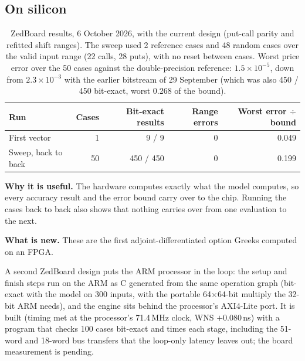 \documentclass[11pt,a4paper]{article}
\newcommand{\useful}[1]{\par\noindent\textbf{\textcolor{accent}{Why it is useful.}} #1\par}
\newcommand{\novel}[1]{\par\noindent\textbf{\textcolor{accent}{What is new.}} #1\par}
\newcommand{\hi}{\rowcolor{accentsoft}}
\begin{document}
\subsection{On silicon}
\begin{table}[H]
\centering
\small
\begin{tabular}{@{}lrrrr@{}}
\toprule
\textbf{Run} & \textbf{Cases} & \textbf{Bit-exact results} & \textbf{Range errors} & \textbf{Worst error $\div$ bound}\\
\midrule
First vector & 1 & 9 / 9 & 0 & 0.049\\
\hi Sweep, back to back & 50 & 450 / 450 & 0 & 0.199\\
\bottomrule
\end{tabular}
\caption{ZedBoard results, 6 October 2026, with the current design (put-call parity
and refitted shift ranges). The sweep used 2 reference cases and 48 random cases over
the valid input range (22 calls, 28 puts), with no reset between cases. Worst price
error over the 50 cases against the double-precision reference: $1.5\times10^{-5}$,
down from $2.3\times10^{-3}$ with the earlier bitstream of 29 September (which was also
450 / 450 bit-exact, worst 0.268 of the bound).}
\end{table}

\useful{The hardware computes exactly what the model computes, so every accuracy result
and the error bound carry over to the chip. Running the cases back to back also shows
that nothing carries over from one evaluation to the next.}
\novel{These are the first adjoint-differentiated option Greeks computed on an FPGA.}

A second ZedBoard design puts the ARM processor in the loop: the setup and finish steps
run on the ARM as C generated from the same operation graph (bit-exact with the model on
300 inputs, with the portable 64$\times$64-bit multiply the 32-bit ARM needs), and the
engine sits behind the processor's AXI4-Lite port. It is built (timing met at the
processor's 71.4\,MHz clock, WNS $+0.080$\,ns) with a program that checks 100 cases
bit-exact and times each stage, including the 51-word and 18-word bus transfers that the
loop-only latency leaves out; the board measurement is pending.
\end{document}
